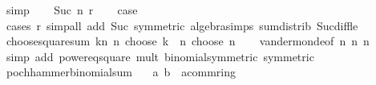 \begin{isabellebody}
\ simp\isanewline
{}\isamarkupfalse%
\isanewline
\ \ \isamarkupfalse%
\ {\isacharparenleft}{\kern0pt}Suc\ n\ r{\isacharparenright}{\kern0pt}\isanewline
\ \ \isamarkupfalse%
\ {\isacharquery}{\kern0pt}case\isanewline
\ \ \ \ \isamarkupfalse%
\ {\isacharparenleft}{\kern0pt}cases\ r{\isacharparenright}{\kern0pt}\ {\isacharparenleft}{\kern0pt}simp{\isacharunderscore}{\kern0pt}all\ add{\isacharcolon}{\kern0pt}\ Suc\ {\isacharbrackleft}{\kern0pt}symmetric{\isacharbrackright}{\kern0pt}\ algebra{\isacharunderscore}{\kern0pt}simps\ sum{\isachardot}{\kern0pt}distrib\ Suc{\isacharunderscore}{\kern0pt}diff{\isacharunderscore}{\kern0pt}le{\isacharparenright}{\kern0pt}\isanewline
{}\isamarkupfalse%
%
\endisatagproof
{\isafoldproof}%
%
\isadelimproof
\isanewline
%
\endisadelimproof
\isanewline
{}\isamarkupfalse%
\ choose{\isacharunderscore}{\kern0pt}square{\isacharunderscore}{\kern0pt}sum{\isacharcolon}{\kern0pt}\ {\isachardoublequoteopen}{\isacharparenleft}{\kern0pt}{\isasymSum}k{\isasymle}n{\isachardot}{\kern0pt}\ {\isacharparenleft}{\kern0pt}n\ choose\ k{\isacharparenright}{\kern0pt}{\isacharcircum}{\kern0pt}{}{\isacharparenright}{\kern0pt}\ {\isacharequal}{\kern0pt}\ {\isacharparenleft}{\kern0pt}{\isacharparenleft}{\kern0pt}{}{\isacharasterisk}{\kern0pt}n{\isacharparenright}{\kern0pt}\ choose\ n{\isacharparenright}{\kern0pt}{\isachardoublequoteclose}\isanewline
%
\isadelimproof
\ \ %
\endisadelimproof
%
\isatagproof
{}\isamarkupfalse%
\ vandermonde{\isacharbrackleft}{\kern0pt}of\ n\ n\ n{\isacharbrackright}{\kern0pt}\isanewline
\ \ \isamarkupfalse%
\ {\isacharparenleft}{\kern0pt}simp\ add{\isacharcolon}{\kern0pt}\ power{}{\isacharunderscore}{\kern0pt}eq{\isacharunderscore}{\kern0pt}square\ mult{\isacharunderscore}{\kern0pt}{}\ binomial{\isacharunderscore}{\kern0pt}symmetric\ {\isacharbrackleft}{\kern0pt}symmetric{\isacharbrackright}{\kern0pt}{\isacharparenright}{\kern0pt}%
\endisatagproof
{\isafoldproof}%
%
\isadelimproof
\isanewline
%
\endisadelimproof
\isanewline
{}\isamarkupfalse%
\ pochhammer{\isacharunderscore}{\kern0pt}binomial{\isacharunderscore}{\kern0pt}sum{\isacharcolon}{\kern0pt}\isanewline
\ \ \ a\ b\ {\isacharcolon}{\kern0pt}{\isacharcolon}{\kern0pt}\ {\isachardoublequoteopen}{\isacharprime}{\kern0pt}a{\isacharcolon}{\kern0pt}{\isacharcolon}{\kern0pt}comm{\isacharunderscore}{\kern0pt}ring{\isacharunderscore}{\kern0pt}{}{\isachardoublequoteclose}\isanewline

\end{isabellebody}
